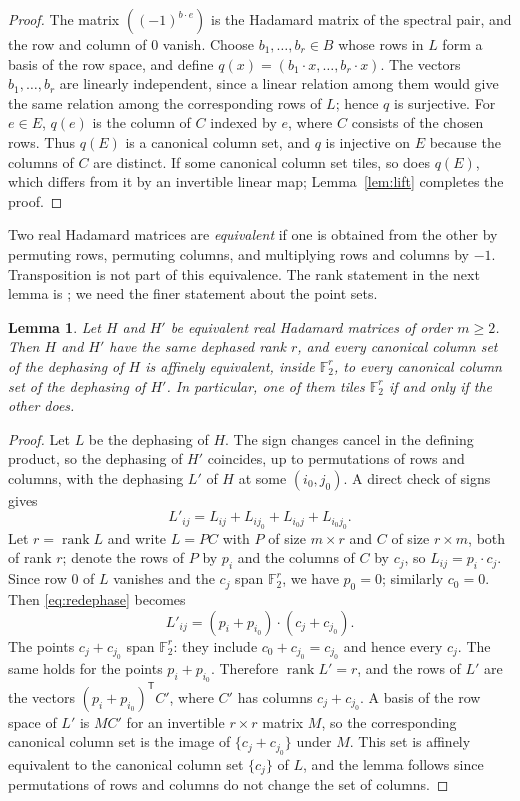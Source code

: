 \documentclass[11pt]{amsart}
\newtheorem{lemma}[theorem]{Lemma}
\theoremstyle{definition}
\theoremstyle{remark}
\numberwithin{equation}{section}
\numberwithin{table}{section}
\newcommand{\F}{\mathbb{F}}
\newcommand{\rank}{\operatorname{rank}}
\newcommand{\T}{\mathsf{T}}
\begin{document}
\begin{proof}
The matrix $((-1)^{b\cdot e})$ is the Hadamard matrix of the spectral pair, and the row and column of $0$ vanish. Choose $b_1,\dots,b_r\in B$ whose rows in $L$ form a basis of the row space, and define $q(x)=(b_1\cdot x,\dots,b_r\cdot x)$. The vectors $b_1,\dots,b_r$ are linearly independent, since a linear relation among them would give the same relation among the corresponding rows of $L$; hence $q$ is surjective. For $e\in E$, $q(e)$ is the column of $C$ indexed by $e$, where $C$ consists of the chosen rows. Thus $q(E)$ is a canonical column set, and $q$ is injective on $E$ because the columns of $C$ are distinct. If some canonical column set tiles, so does $q(E)$, which differs from it by an invertible linear map; Lemma~\ref{lem:lift} completes the proof.
\end{proof}

Two real Hadamard matrices are \emph{equivalent} if one is obtained from the other by permuting rows, permuting columns, and multiplying rows and columns by $-1$. Transposition is not part of this equivalence. The rank statement in the next lemma is \cite[Proposition~4.3]{FS20}; we need the finer statement about the point sets.

\begin{lemma}\label{lem:equivalence}
Let $H$ and $H'$ be equivalent real Hadamard matrices of order $m\ge2$. Then $H$ and $H'$ have the same dephased rank $r$, and every canonical column set of the dephasing of $H$ is affinely equivalent, inside $\F_2^r$, to every canonical column set of the dephasing of $H'$. In particular, one of them tiles $\F_2^r$ if and only if the other does.
\end{lemma}

\begin{proof}
Let $L$ be the dephasing of $H$. The sign changes cancel in the defining product, so the dephasing of $H'$ coincides, up to permutations of rows and columns, with the dephasing $L'$ of $H$ at some $(i_0,j_0)$. A direct check of signs gives
\begin{equation}\label{eq:redephase}
L'_{ij}=L_{ij}+L_{ij_0}+L_{i_0j}+L_{i_0j_0}.
\end{equation}
Let $r=\rank L$ and write $L=PC$ with $P$ of size $m\times r$ and $C$ of size $r\times m$, both of rank $r$; denote the rows of $P$ by $p_i$ and the columns of $C$ by $c_j$, so $L_{ij}=p_i\cdot c_j$. Since row $0$ of $L$ vanishes and the $c_j$ span $\F_2^r$, we have $p_0=0$; similarly $c_0=0$. Then \eqref{eq:redephase} becomes
\[
L'_{ij}=(p_i+p_{i_0})\cdot(c_j+c_{j_0}).
\]
The points $c_j+c_{j_0}$ span $\F_2^r$: they include $c_0+c_{j_0}=c_{j_0}$ and hence every $c_j$. The same holds for the points $p_i+p_{i_0}$. Therefore $\rank L'=r$, and the rows of $L'$ are the vectors $(p_i+p_{i_0})^{\T}C'$, where $C'$ has columns $c_j+c_{j_0}$. A basis of the row space of $L'$ is $MC'$ for an invertible $r\times r$ matrix $M$, so the corresponding canonical column set is the image of $\{c_j+c_{j_0}\}$ under $M$. This set is affinely equivalent to the canonical column set $\{c_j\}$ of $L$, and the lemma follows since permutations of rows and columns do not change the set of columns.
\end{proof}
\end{document}
